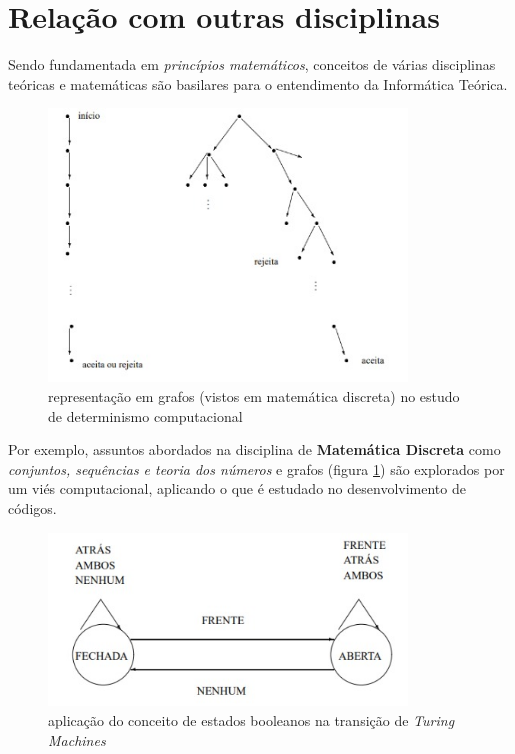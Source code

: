 \documentclass{article}
\begin{document}
\section{Relação com outras disciplinas}
Sendo fundamentada em \textit{princípios matemáticos}, conceitos de várias disciplinas teóricas e matemáticas são basilares para o entendimento da Informática Teórica. 

\begin{figure}[ht]
    \centering
    \includegraphics[width=0.85\textwidth]{grafos}
    \caption{representação em grafos (vistos em matemática discreta) no estudo de determinismo computacional}
    \label{fig:exemplo1}
\end{figure}

Por exemplo, assuntos abordados na disciplina de \textbf{Matemática Discreta} como \textit{conjuntos, sequências e teoria dos números} e grafos (figura \ref{fig:exemplo1}) são explorados por um viés computacional, aplicando o que é estudado no desenvolvimento de códigos.

\begin{figure}[ht]
    \centering
    \includegraphics[width=0.85\textwidth]{logica}
    \caption{aplicação do conceito de estados booleanos na transição de \emph{Turing Machines}}
    \label{fig:exemplo2}
\end{figure}
\end{document}

